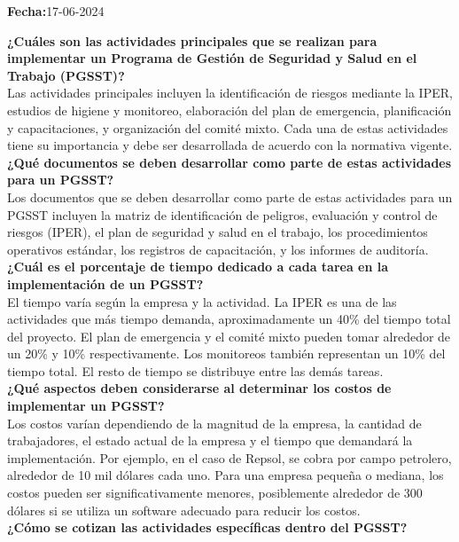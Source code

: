 \noindent
\textbf{Fecha:}17-06-2024

\noindent
\textbf{¿Cuáles son las actividades principales que se realizan para implementar un Programa de Gestión de Seguridad y Salud en el Trabajo (PGSST)?}\\
Las actividades principales incluyen la identificación de riesgos mediante la IPER, estudios de higiene y monitoreo, elaboración del plan de emergencia, planificación y capacitaciones, y organización del comité mixto. Cada una de estas actividades tiene su importancia y debe ser desarrollada de acuerdo con la normativa vigente.
\\
\noindent
\textbf{¿Qué documentos se deben desarrollar como parte de estas actividades para un PGSST?}\\
Los documentos que se deben desarrollar como parte de estas actividades para un PGSST incluyen la matriz de identificación de peligros, evaluación y control de riesgos (IPER), el plan de seguridad y salud en el trabajo, los procedimientos operativos estándar, los registros de capacitación, y los informes de auditoría.
\\
\noindent
\textbf{¿Cuál es el porcentaje de tiempo dedicado a cada tarea en la implementación de un PGSST?}\\
El tiempo varía según la empresa y la actividad. La IPER es una de las actividades que más tiempo demanda, aproximadamente un 40\% del tiempo total del proyecto. El plan de emergencia y el comité mixto pueden tomar alrededor de un 20\% y 10\% respectivamente. Los monitoreos también representan un 10\% del tiempo total. El resto de tiempo se distribuye entre las demás tareas.
\\
\noindent
\textbf{¿Qué aspectos deben considerarse al determinar los costos de implementar un PGSST?}\\
Los costos varían dependiendo de la magnitud de la empresa, la cantidad de trabajadores, el estado actual de la empresa y el tiempo que demandará la implementación. Por ejemplo, en el caso de Repsol, se cobra por campo petrolero, alrededor de 10 mil dólares cada uno. Para una empresa pequeña o mediana, los costos pueden ser significativamente menores, posiblemente alrededor de 300 dólares si se utiliza un software adecuado para reducir los costos.
\\
\noindent
\textbf{¿Cómo se cotizan las actividades específicas dentro del PGSST?}\\
